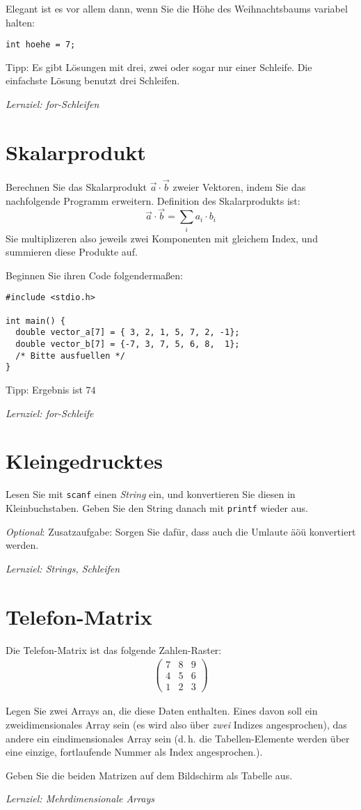 \documentclass[
	ngerman,
	fontsize=10pt,
	parskip=half,
	titlepage=true,
	DIV=12
]{scrartcl}
\begin{document}
Elegant ist es vor allem dann, wenn Sie die Höhe des Weihnachtsbaums variabel halten:

\texttt{int hoehe = 7;}

Tipp: Es gibt Lösungen mit drei, zwei oder sogar nur einer Schleife. Die einfachste Lösung benutzt drei Schleifen.

\emph{Lernziel: for-Schleifen}

\section{Skalarprodukt}

Berechnen Sie das Skalarprodukt $\vec a \cdot \vec b$ zweier Vektoren,
indem Sie das nachfolgende Programm erweitern. Definition des
Skalarprodukts ist:
%
\[ \vec a \cdot \vec b = \sum_i a_i \cdot b_i \]
%
Sie multiplizeren also jeweils zwei Komponenten mit gleichem Index, und summieren diese Produkte auf.

Beginnen Sie ihren Code folgendermaßen:
\begin{verbatim}
#include <stdio.h>

int main() {
  double vector_a[7] = { 3, 2, 1, 5, 7, 2, -1};
  double vector_b[7] = {-7, 3, 7, 5, 6, 8,  1};
  /* Bitte ausfuellen */
}
\end{verbatim}

Tipp: Ergebnis ist $74$ 

\emph{Lernziel: for-Schleife}

\section{Kleingedrucktes}
Lesen Sie mit \texttt{scanf} einen {\em String} ein, und konvertieren Sie diesen in Kleinbuchstaben. Geben Sie den String danach mit \texttt{printf} wieder aus.

\emph{Optional}: Zusatzaufgabe: Sorgen Sie dafür, dass auch die Umlaute äöü konvertiert werden.

\emph{Lernziel: Strings, Schleifen}

\section{Telefon-Matrix}
Die Telefon-Matrix ist das folgende Zahlen-Raster:
\begin{align*}
\begin{pmatrix}
	7 & 8 & 9 \\
	4 & 5 & 6 \\
	1 & 2 & 3
\end{pmatrix}
\end{align*}

Legen Sie zwei Arrays an, die diese Daten enthalten. Eines davon soll ein zweidimensionales Array sein (es wird also über \emph{zwei} Indizes angesprochen), das andere ein eindimensionales Array sein (d.\,h. die Tabellen-Elemente werden über eine einzige, fortlaufende Nummer als Index angesprochen.).

Geben Sie die beiden Matrizen auf dem Bildschirm als Tabelle aus.

\emph{Lernziel: Mehrdimensionale Arrays}
\end{document}
